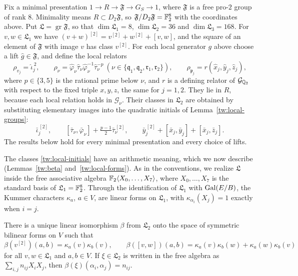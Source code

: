 Fix a minimal presentation $1\to R\to\mathfrak F\to G_S\to1$, where
$\mathfrak F$ is a free pro-$2$ group of rank $8$. Minimality means
$R\subset D_2\mathfrak F$, so $\mathfrak F/D_2\mathfrak F=\mathbb F_2^8$ with the
coordinates above. Put $\mathfrak L=\operatorname{gr}\mathfrak F$, so that
$\dim\mathfrak L_1=8$, $\dim\mathfrak L_2=36$ and $\dim\mathfrak L_3=168$.
For $v,w\in\mathfrak L_1$ we have $(v+w)^{[2]}=v^{[2]}+w^{[2]}+[v,w]$, and the
square of an element of $\mathfrak F$ with image $v$ has class $v^{[2]}$. For
each local generator $g$ above choose a lift $\hat g\in\mathfrak F$, and define
the local relators
\begin{equation}\label{tw:relators}
 \rho_{v_j}=\hat\iota_j^{\,2},\qquad
 \rho_\nu=\hat\varphi_\nu\hat\tau_\nu\hat\varphi_\nu^{-1}\hat\tau_\nu^{-p}
 \ (\nu\in\{\mathfrak q_1,\mathfrak q_2,\mathfrak r_1,\mathfrak r_2\}),\qquad
 \rho_{\mathfrak p_j}=r(\hat x_j,\hat y_j,\hat z_j),
\end{equation}
where $p\in\{3,5\}$ is the rational prime below $\nu$, and $r$ is a
defining relator of $\mathcal G_{\mathbb Q_2}$ with respect to the fixed triple
$x,y,z$, the same for $j=1,2$. They lie in $R$, because each local relation
holds in $\mathcal G_\nu$. Their classes in $\mathfrak L_2$ are obtained by
substituting elementary images into the quadratic initials of
Lemma~\ref{tw:local-groups}:
\begin{equation}\label{tw:local-initials}
 \bar\iota_j^{\,[2]},\qquad
 [\bar\tau_\nu,\bar\varphi_\nu]+\tfrac{p-1}2\bar\tau_\nu^{\,[2]},\qquad
 \bar y_j^{\,[2]}+[\bar x_j,\bar y_j]+[\bar x_j,\bar z_j].
\end{equation}
The results below hold for every minimal presentation and every choice of
lifts.

The classes \eqref{tw:local-initials} have an arithmetic meaning, which we
now describe (Lemmas~\ref{tw:beta} and~\ref{tw:local-forms}). As in the
conventions, we realize $\mathfrak L$ inside the free associative algebra
$\mathbb F_2\langle X_0,\dots,X_7\rangle$, where $X_0,\dots,X_7$ is the standard
basis of $\mathfrak L_1=\mathbb F_2^8$. Through the identification of $\mathfrak L_1$
with $\operatorname{Gal}(E/B)$, the Kummer characters $\kappa_a$, $a\in V$, are linear forms
on $\mathfrak L_1$, with $\kappa_{\alpha_i}(X_j)=1$ exactly when $i=j$.

\begin{lemma}\label{tw:beta}
There is a unique linear isomorphism $\beta$ from $\mathfrak L_2$ onto the
space of symmetric bilinear forms on $V$ such that
\[
 \beta(v^{[2]})(a,b)=\kappa_a(v)\kappa_b(v),\qquad
 \beta([v,w])(a,b)=\kappa_a(v)\kappa_b(w)+\kappa_a(w)\kappa_b(v)
\]
for all $v,w\in\mathfrak L_1$ and $a,b\in V$. If $\xi\in\mathfrak L_2$ is
written in the free algebra as $\sum_{i,j}n_{ij}X_iX_j$, then
$\beta(\xi)(\alpha_i,\alpha_j)=n_{ij}$.
\end{lemma}


